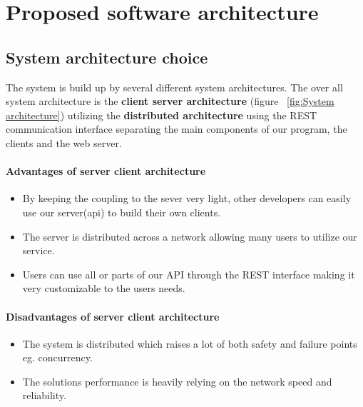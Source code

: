 \section{Proposed software architecture}
\label{sec:Proposed software architecture}






\subsection{System architecture choice}
The system is build up by several different system architectures.
The over all system architecture is the \textbf{client server architecture} (figure ~\ref{fig:System architecture}) utilizing the \textbf{distributed architecture} using the REST communication interface separating  the main components of our program, the clients and the web server.

\paragraph{Advantages of server client architecture}
\begin{itemize}
	\item By keeping the coupling to the sever very light, other developers can easily use our server(api) to build their own clients. \\
	\item The server is distributed across a network allowing many users to utilize our service.
	\item Users can use all or parts of our API through the REST interface making it very customizable to the users needs.
\end{itemize}
\paragraph{Disadvantages of server client architecture}
\begin{itemize}
	\item The system is distributed which raises a lot of both safety and failure points eg. concurrency.  \\
	\item The solutions performance is heavily relying on the network speed and reliability.  
\end{itemize}

